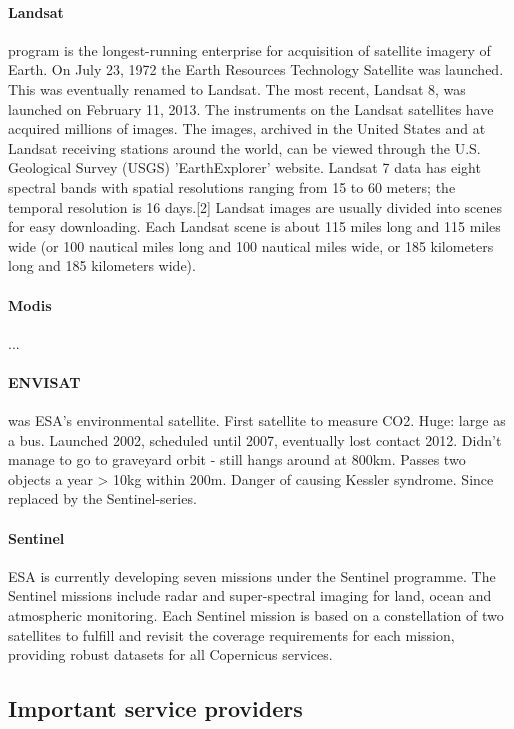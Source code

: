 \paragraph{Landsat} program is the longest-running enterprise for acquisition of satellite imagery of Earth.
On July 23, 1972 the Earth Resources Technology Satellite was launched. This was eventually renamed to Landsat. 
The most recent, Landsat 8, was launched on February 11, 2013. The instruments on the Landsat satellites have acquired millions of images.
The images, archived in the United States and at Landsat receiving stations around the world,
 can be viewed through the U.S. Geological Survey (USGS) 'EarthExplorer' website.
 Landsat 7 data has eight spectral bands with spatial resolutions ranging from 15 to 60 meters;
 the temporal resolution is 16 days.[2] Landsat images are usually divided into scenes for easy downloading.
 Each Landsat scene is about 115 miles long and 115 miles wide (or 100 nautical miles long and 100 nautical miles wide, or 185 kilometers long and 185 kilometers wide).

\paragraph{Modis} ...


\paragraph{ENVISAT} was ESA's environmental satellite. First satellite to measure CO2. Huge: large as a bus. 
Launched 2002, scheduled until 2007, eventually lost contact 2012. Didn't manage to go to graveyard orbit - still hangs around at 800km.
Passes two objects a year > 10kg within 200m. Danger of causing Kessler syndrome.
Since replaced by the Sentinel-series.

\paragraph{Sentinel} ESA is currently developing seven missions under the Sentinel programme.
The Sentinel missions include radar and super-spectral imaging for land, ocean and atmospheric monitoring.
Each Sentinel mission is based on a constellation of two satellites to fulfill and revisit the coverage requirements
for each mission, providing robust datasets for all Copernicus services.


\subsection{Important service providers}

